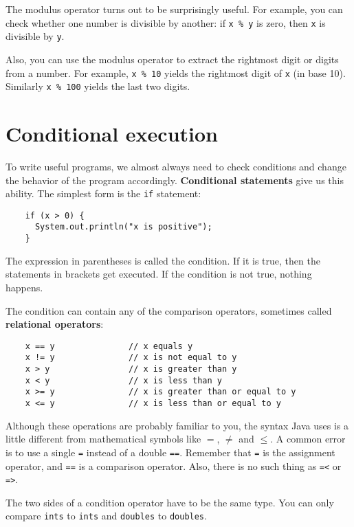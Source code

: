 \documentclass[12pt]{book}
\theoremstyle{definition}
\begin{document}
The modulus operator turns out to be surprisingly useful.  For
example, you can check whether one number is divisible by
another: if {\tt x \% y} is zero, then {\tt x} is divisible
by {\tt y}.

Also, you can use the modulus operator to extract the rightmost
digit or digits from a number.  For example, {\tt x \% 10} yields
the rightmost digit of {\tt x} (in base 10).  Similarly
{\tt x \% 100} yields the last two digits.


\section{Conditional execution}

To write useful programs, we almost always need
to check conditions and change the behavior of the program
accordingly.  {\bf Conditional statements} give us this ability.  The
simplest form is the {\tt if} statement:

\begin{lstlisting}
    if (x > 0) {
      System.out.println("x is positive");
    }
\end{lstlisting}
%
The expression in parentheses is called the condition.
If it is true, then the statements in brackets get executed.
If the condition is not true, nothing happens.


The condition can contain any of the comparison operators,
sometimes called {\bf relational operators}:

\begin{lstlisting}
    x == y               // x equals y
    x != y               // x is not equal to y
    x > y                // x is greater than y
    x < y                // x is less than y
    x >= y               // x is greater than or equal to y
    x <= y               // x is less than or equal to y
\end{lstlisting}
%
Although these operations are probably familiar to you, the
syntax Java uses is a little different from mathematical
symbols like $=$, $\neq$ and $\le$.  A common error is
to use a single {\tt =} instead of a double {\tt ==}.  Remember
that {\tt =} is the assignment operator, and {\tt ==} is
a comparison operator.  Also, there is no such thing as
{\tt =<} or {\tt =>}.

The two sides of a condition operator have to be the same
type.  You can only compare {\tt ints} to {\tt ints} and
{\tt doubles} to {\tt doubles}.
\end{document}
